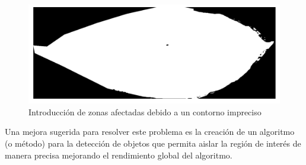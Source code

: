 \begin{enumerate}
\begin{figure}[H]
\centering
\includegraphics[scale=1]{images/consideration_contour_binary.png}
\caption{Introducción de zonas afectadas debido a un contorno impreciso}
\label{img:issue_countour_binary}
\end{figure}

Una mejora sugerida para resolver este problema es la creación de un algoritmo (o método) para la detección de objetos que permita aislar la región de interés de manera precisa mejorando el rendimiento global del algoritmo.

\end{enumerate}